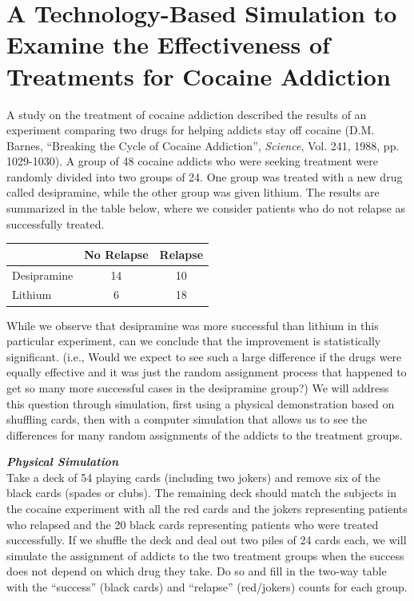 \documentclass[twoside,openany]{tufte-book}
\begin{document}
\noindent{}

\section{\textbf{A Technology-Based Simulation to Examine the Effectiveness of Treatments for Cocaine Addiction}}
A study on the treatment of cocaine addiction described the results of an experiment comparing two drugs for helping addicts stay off cocaine (D.M. Barnes, ``Breaking the Cycle of Cocaine Addiction'', \textit{Science}, Vol. 241, 1988,  pp. 1029-1030).  A group of 48 cocaine addicts who were seeking treatment were randomly divided into two groups of 24.  One group was treated with a new drug called desipramine, while the other group was given lithium.  The results are summarized in the table below, where we consider patients who do not relapse as successfully treated. 

\begin{table}[!ht]
\begin{center}
\begin{tabular}{|l|c|c|}
\hline
& No Relapse & Relapse\\
\hline
Desipramine & 14 &  10\\
\hline
Lithium & 6 & 18\\
\hline
\end{tabular}
\end{center}
\end{table}

While we observe that desipramine was more successful than lithium in this particular experiment, can we conclude that the improvement is statistically significant. (i.e., Would we expect to see such a large difference if the drugs were equally effective and it was just the random assignment process that happened to get so many more successful cases in the desipramine group?)  We will address this question through simulation, first using a physical demonstration based on shuffling cards, then with a computer simulation that allows us to see the differences for many random assignments of the addicts to the treatment groups. \\
\vspace{12pt}
\newpage

\noindent\textbf{\textit{Physical Simulation}}\\
\vspace{3pt}
Take a deck of 54 playing cards (including two jokers) and remove six of the black cards (spades or clubs).  The remaining deck should match the subjects in the cocaine experiment with all the red cards and the jokers representing patients who relapsed and the 20 black cards representing patients who were treated successfully.  If we shuffle the deck and deal out two piles of 24 cards each, we will simulate the assignment of addicts to the two treatment groups when the success does not depend on which drug they take. Do so and fill in the two-way table with the ``success'' (black cards) and ``relapse'' (red/jokers) counts for each group.
\end{document}
